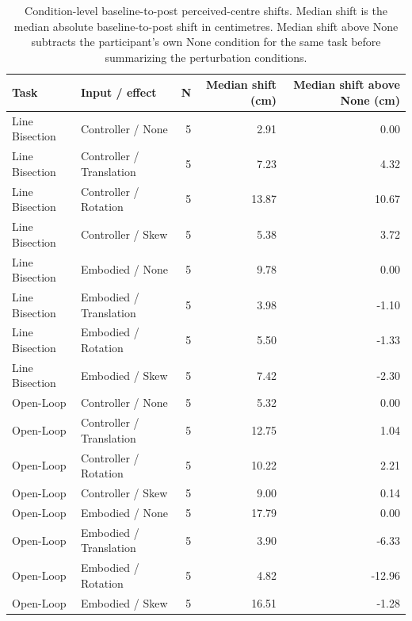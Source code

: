 \begin{table}[H]
    \centering
    \footnotesize
    \setlength{\tabcolsep}{4pt}
    \renewcommand{\arraystretch}{1.15}
    \begin{tabularx}{\linewidth}{llrrr}
        \toprule
        \textbf{Task} & \textbf{Input / effect} & \textbf{N} & \textbf{Median shift (cm)} & \textbf{Median shift above None (cm)} \\
        \midrule
        Line Bisection & Controller / None & 5 & 2.91 & 0.00 \\
        Line Bisection & Controller / Translation & 5 & 7.23 & 4.32 \\
        Line Bisection & Controller / Rotation & 5 & 13.87 & 10.67 \\
        Line Bisection & Controller / Skew & 5 & 5.38 & 3.72 \\
        Line Bisection & Embodied / None & 5 & 9.78 & 0.00 \\
        Line Bisection & Embodied / Translation & 5 & 3.98 & -1.10 \\
        Line Bisection & Embodied / Rotation & 5 & 5.50 & -1.33 \\
        Line Bisection & Embodied / Skew & 5 & 7.42 & -2.30 \\
        Open-Loop & Controller / None & 5 & 5.32 & 0.00 \\
        Open-Loop & Controller / Translation & 5 & 12.75 & 1.04 \\
        Open-Loop & Controller / Rotation & 5 & 10.22 & 2.21 \\
        Open-Loop & Controller / Skew & 5 & 9.00 & 0.14 \\
        Open-Loop & Embodied / None & 5 & 17.79 & 0.00 \\
        Open-Loop & Embodied / Translation & 5 & 3.90 & -6.33 \\
        Open-Loop & Embodied / Rotation & 5 & 4.82 & -12.96 \\
        Open-Loop & Embodied / Skew & 5 & 16.51 & -1.28 \\
        \bottomrule
    \end{tabularx}
    \caption{Condition-level baseline-to-post perceived-centre shifts. Median shift is the median absolute baseline-to-post shift in centimetres. Median shift above None subtracts the participant's own None condition for the same task before summarizing the perturbation conditions.}
    \label{tab:results-condition-summary}
\end{table}

